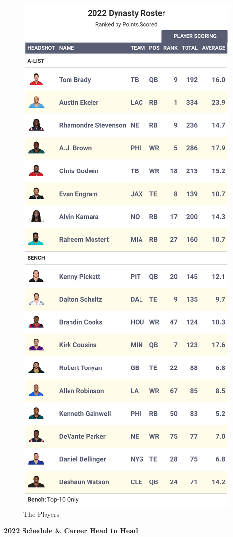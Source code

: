 \documentclass[
]{article}
\begin{document}
\begin{figure}
\includegraphics[width=0.75\linewidth,height=0.75\textheight]{output/2022/dynasty_roster_Johnwickmd} \caption{The Players}\label{fig:unnamed-chunk-24}
\end{figure}
\newpage

\textbf{2022 Schedule \& Career Head to Head}
\end{document}
